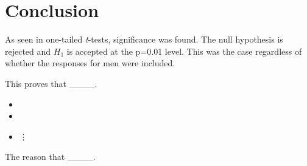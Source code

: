 \section {Conclusion}
\label{conclusion}

As seen in one-tailed \textit{t}-tests, significance was found.  The null hypothesis is rejected and $H_{1}$ is accepted at the p=0.01 level.  This was the case regardless of whether the responses for men were included.

This proves that \_\_\_\_.

\begin{itemize}
	\item 
	\item 
	\item 
	\vdots
\end{itemize}

The reason that \_\_\_\_.
